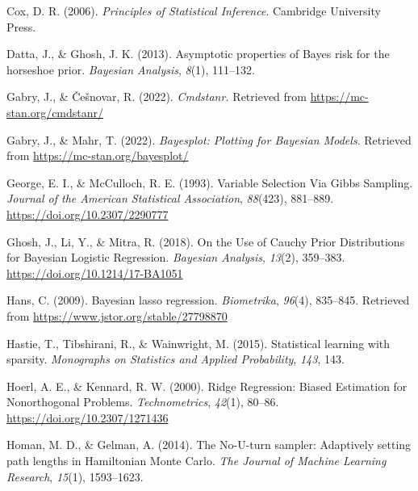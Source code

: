 \documentclass[
  man, donotrepeattitle,floatsintext]{apa6}
\newlength{\cslhangindent}
\newlength{\cslentryspacingunit} %
\newenvironment{CSLReferences}[2] %
 {%
  \setlength{\parindent}{0pt}
  \ifodd #1
  \let\oldpar\par
  \def\par{\hangindent=\cslhangindent\oldpar}
  \fi
  \setlength{\parskip}{#2\cslentryspacingunit}
 }%
 {}
\begin{document}
\begin{CSLReferences}{1}{0}
\leavevmode{}%
Cox, D. R. (2006). \emph{Principles of {Statistical} {Inference}}. Cambridge University Press.

\leavevmode{}%
Datta, J., \& Ghosh, J. K. (2013). Asymptotic properties of {Bayes} risk for the horseshoe prior. \emph{Bayesian Analysis}, \emph{8}(1), 111--132.

\leavevmode{}%
Gabry, J., \& Češnovar, R. (2022). \emph{Cmdstanr.} Retrieved from \url{https://mc-stan.org/cmdstanr/}

\leavevmode{}%
Gabry, J., \& Mahr, T. (2022). \emph{Bayesplot: {Plotting} for {Bayesian} {Models}}. Retrieved from \url{https://mc-stan.org/bayesplot/}

\leavevmode{}%
George, E. I., \& McCulloch, R. E. (1993). Variable {Selection} {Via} {Gibbs} {Sampling}. \emph{Journal of the American Statistical Association}, \emph{88}(423), 881--889. \url{https://doi.org/10.2307/2290777}

\leavevmode{}%
Ghosh, J., Li, Y., \& Mitra, R. (2018). On the {Use} of {Cauchy} {Prior} {Distributions} for {Bayesian} {Logistic} {Regression}. \emph{Bayesian Analysis}, \emph{13}(2), 359--383. \url{https://doi.org/10.1214/17-BA1051}

\leavevmode{}%
Hans, C. (2009). Bayesian lasso regression. \emph{Biometrika}, \emph{96}(4), 835--845. Retrieved from \url{https://www.jstor.org/stable/27798870}

\leavevmode{}%
Hastie, T., Tibshirani, R., \& Wainwright, M. (2015). Statistical learning with sparsity. \emph{Monographs on Statistics and Applied Probability}, \emph{143}, 143.

\leavevmode{}%
Hoerl, A. E., \& Kennard, R. W. (2000). Ridge {Regression}: {Biased} {Estimation} for {Nonorthogonal} {Problems}. \emph{Technometrics}, \emph{42}(1), 80--86. \url{https://doi.org/10.2307/1271436}

\leavevmode{}%
Homan, M. D., \& Gelman, A. (2014). The {No}-{U}-turn sampler: Adaptively setting path lengths in {Hamiltonian} {Monte} {Carlo}. \emph{The Journal of Machine Learning Research}, \emph{15}(1), 1593--1623.


\end{CSLReferences}
\end{document}
